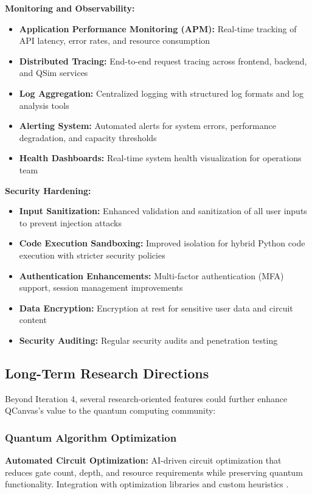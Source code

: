 \textbf{Monitoring and Observability:}
\begin{itemize}
    \item \textbf{Application Performance Monitoring (APM):} Real-time tracking of API latency, error rates, and resource consumption
    \item \textbf{Distributed Tracing:} End-to-end request tracing across frontend, backend, and QSim services
    \item \textbf{Log Aggregation:} Centralized logging with structured log formats and log analysis tools
    \item \textbf{Alerting System:} Automated alerts for system errors, performance degradation, and capacity thresholds
    \item \textbf{Health Dashboards:} Real-time system health visualization for operations team
\end{itemize}

\textbf{Security Hardening:}
\begin{itemize}
    \item \textbf{Input Sanitization:} Enhanced validation and sanitization of all user inputs to prevent injection attacks
    \item \textbf{Code Execution Sandboxing:} Improved isolation for hybrid Python code execution with stricter security policies
    \item \textbf{Authentication Enhancements:} Multi-factor authentication (MFA) support, session management improvements
    \item \textbf{Data Encryption:} Encryption at rest for sensitive user data and circuit content
    \item \textbf{Security Auditing:} Regular security audits and penetration testing
\end{itemize}

\subsection{Long-Term Research Directions}

Beyond Iteration 4, several research-oriented features could further enhance QCanvas's value to the quantum computing community:

\subsubsection{Quantum Algorithm Optimization}

\textbf{Automated Circuit Optimization:} AI-driven circuit optimization that reduces gate count, depth, and resource requirements while preserving quantum functionality. Integration with optimization libraries and custom heuristics \cite{sivarajah2020tket}.


